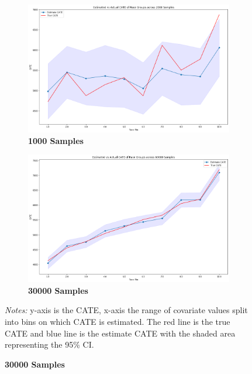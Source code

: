 \documentclass[12pt]{article}
\begin{document}
\begin{figure}[!htp]
\caption{Estimated vs. Actual CATE across Race Groups}
	\centering
	\begin{subfigure} [h] {0.49\linewidth}
		\caption{\textbf{1000 Samples}}
   	 	\includegraphics[width = \linewidth]{Graphs/s2_race2000.png}
	\end{subfigure}
	\begin{subfigure} [h] {0.49\linewidth}
		\caption{\textbf{30000 Samples}}
   	 	\includegraphics[width = \linewidth]{Graphs/s2_race60000.png}
	\end{subfigure}
\footnotesize
\emph{Notes:}  y-axis is the CATE, x-axis the range of covariate values split into bins on which CATE is estimated. The red line is the true CATE and blue line is the estimate CATE with the shaded area representing the 95\% CI.
\end{figure} 
\end{document}
